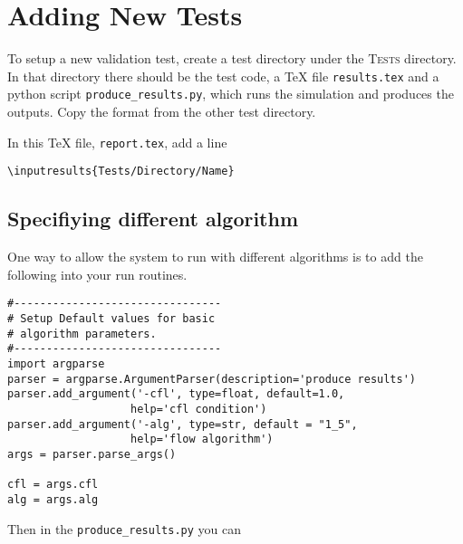 \documentclass[11pt,a4paper]{report}
\begin{document}
\chapter{Adding New Tests}


To setup a new validation test, create a test directory under the
\textsc{Tests} directory. In that directory there should be the test code, a
\TeX{} file \texttt{results.tex} and a python script
\texttt{produce\_results.py}, which runs the simulation and produces the
outputs. Copy the format from the other test directory. 

In this \TeX{} file, \texttt{report.tex}, add a line
\begin{verbatim}
\inputresults{Tests/Directory/Name}
\end{verbatim}



\section{Specifiying different algorithm}
One  way to allow the system to run with different algorithms is to 
add the following
into your run routines.
\begin{verbatim}
#--------------------------------
# Setup Default values for basic
# algorithm parameters.
#--------------------------------
import argparse
parser = argparse.ArgumentParser(description='produce results')
parser.add_argument('-cfl', type=float, default=1.0,
                   help='cfl condition')
parser.add_argument('-alg', type=str, default = "1_5",
                   help='flow algorithm')
args = parser.parse_args()

cfl = args.cfl
alg = args.alg
\end{verbatim}

Then in the \texttt{produce\_results.py} you can 
\end{document}
